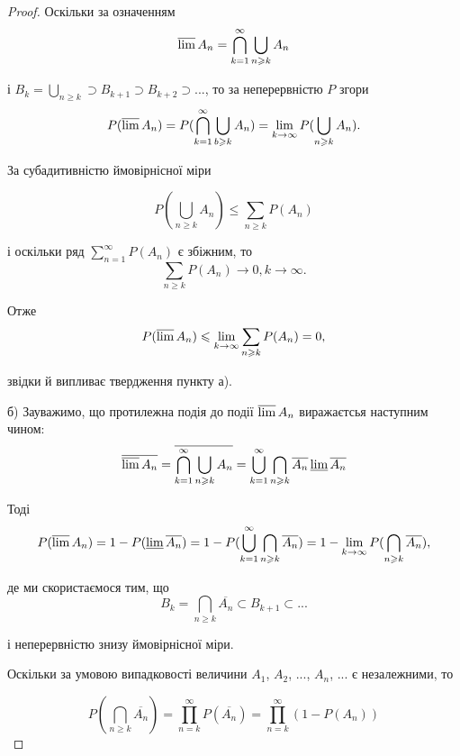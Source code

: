 \begin{proof}
    Оскільки за означенням
    $$\varlimsup A_n = \bigcap\limits_{k=1}^{\infty} \bigcup\limits_{n \geqslant k} A_n$$
    
    і $B_k = \bigcup\limits_{n \geqslant k} \supset B_{k+1} \supset B_{k+2} \supset ...$,
    то за неперервністю $P$ згори
    $$P(\varlimsup A_n)
    = P(\bigcap\limits_{k=1}^{\infty} \bigcup\limits_{b \geqslant k} A_n)
    = \lim\limits_{k \rightarrow \infty} P(\bigcup\limits_{n \geqslant k} A_n).$$
    
    За субадитивністю ймовірнісної міри 
    
    $$P(\bigcup\limits_{n \geqslant k} A_n)
    \leqslant \sum\limits_{n \geqslant k} P(A_n)$$
    
    і оскільки ряд $\sum\limits_{n = 1}^{\infty} P(A_n)$ є збіжним, то 
    $$\sum\limits_{n \geqslant k} P(A_n) \rightarrow 0, k \rightarrow \infty.$$
    
    Отже
    $$P(\varlimsup A_n)
    \leqslant \lim\limits_{k \rightarrow \infty} \sum\limits_{n \geqslant k} P(A_n)
    = 0,$$
    
    звідки й випливає твердження пункту а).

    б) Зауважимо, що протилежна подія до події $\varlimsup A_n$
    виражаєтсья наступним чином:
    \begin{equation}
        \overline{\varlimsup A_n}
        = \overline{\bigcap\limits_{k=1}^{\infty} \bigcup\limits_{n \geqslant k} A_n}
        = \bigcup\limits_{k=1}^{\infty} \bigcap\limits_{n \geqslant k} \overline{A_n}
        \varliminf \overline{A_n}
    \end{equation}

    Тоді 
    $$P(\varlimsup A_n)
    = 1 - P(\varliminf \overline{A_n})
    = 1 - P(\bigcup\limits_{k = 1}^{\infty} \bigcap\limits_{n \geqslant k} \overline{A_n})
    = 1 - \lim\limits_{k \rightarrow \infty} P(\bigcap\limits_{n \geqslant k} \overline{A_n}),$$

    де ми скористаємося тим, що
    $$B_k = \bigcap\limits_{n \geqslant k} \overline{A_n} \subset B_{k+1} \subset ...$$

    і неперервністю знизу ймовірнісної міри.

    Оскільки за умовою випадковості величини $A_1$, $A_2$, ...,
    $A_n$, ... є незалежними, то

    $$P(\bigcap\limits_{n \geqslant k} \overline{A_n})
    = \prod\limits_{n = k}^{\infty} P(\overline{A_n})
    = \prod\limits_{n = k}^{\infty} (1 - P(A_n))$$


\end{proof}
